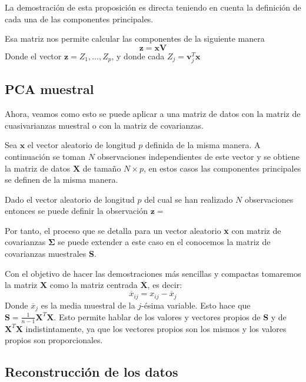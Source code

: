 \noindent La demostración de esta proposición es directa teniendo en cuenta la definición de cada una de las componentes principales. 

\noindent Esa matriz nos permite calcular las componentes de la siguiente manera
\begin{equation}
\mathbf{z}=\mathbf{x} \mathbf{V}
\end{equation} 
\noindent Donde el vector $\mathbf{z}=Z_1,\ldots, Z_p$, y donde cada $Z_j=\mathbf{v}_j^T\mathbf{x}$
\subsection{PCA muestral}
\noindent Ahora, veamos como esto se puede aplicar a una matriz de datos con la matriz de cuasivarianzas muestral o con la matriz de covarianzas. 

\noindent Sea $\mathbf{x}$ el vector aleatorio de longitud $p$ definida de la misma manera. A continuación se toman $N$ observaciones independientes de este vector y se obtiene la matriz de datos $\mathbf{X}$ de tamaño $N\times p$, en estos casos las componentes principales se definen de la misma manera. 



\begin{defi}
Dado el vector aleatorio de longitud $p$ del cual se han realizado $N$ observaciones entonces se puede definir la observación $\mathbf{z}=\mathbf{}$
\end{defi}

\noindent Por tanto, el proceso que se detalla para un vector aleatorio \textbf{x} con matriz de covarianzas $\mathbf{\Sigma}$ se puede extender a este caso en el conocemos la matriz de covarianzas muestrales \textbf{S}.

\noindent Con el objetivo de hacer las demostraciones más sencillas y compactas tomaremos la matriz $\textbf{X}$ como la matriz centrada $\overline{\textbf{X}}$, es decir: 
\begin{equation}
\overline{x}_{ij}=x_{ij}-\overline{x}_j
\end{equation}
Donde $\overline{x}_j$ es la media muestral de la $j$-ésima variable. Esto hace que $\textbf{S}=\frac{1}{n-1}\textbf{X}^T\textbf{X}$. Esto permite hablar de los valores y vectores propios de \textbf{S} y de $\textbf{X}^T \textbf{X}$ indistintamente, ya que los vectores propios son los mismos y los valores propios son proporcionales. 

\subsection{Reconstrucción de los datos}

